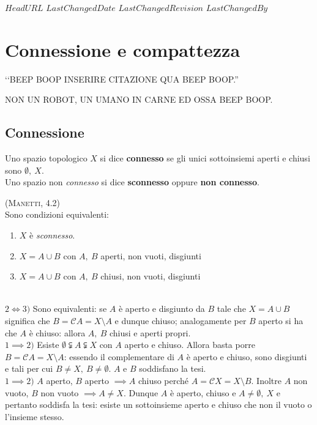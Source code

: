 \svnidlong
{$HeadURL$}
{$LastChangedDate$}
{$LastChangedRevision$}
{$LastChangedBy$}

\chapter{Connessione e compattezza}

\begin{introduction}
‘‘BEEP BOOP INSERIRE CITAZIONE QUA BEEP BOOP.''
\begin{flushright}
	\textsc{NON UN ROBOT,} UN UMANO IN CARNE ED OSSA BEEP BOOP.
\end{flushright}
\end{introduction}

\section{Connessione}
\begin{define}
Uno spazio topologico $X$ si dice \textbf{connesso} se gli unici sottoinsiemi aperti e chiusi sono $\emptyset,\ X$.\\
Uno spazio non \textit{connesso} si dice \textbf{sconnesso} oppure \textbf{non connesso}.
\end{define}
\begin{lemming}\label{sconnesso}\textsc{(Manetti, 4.2)}\\
	Sono condizioni equivalenti:
	\begin{enumerate}
		\item $X$ è \textit{sconnesso}.
		\item $X=A\cup B$ con $A,\ B$ aperti, non vuoti, disgiunti
		\item $X=A\cup B$ con $A,\ B$ chiusi, non vuoti, disgiunti
	\end{enumerate}
\end{lemming}
\begin{demonstration}~{}\\
$2\iff3)$ Sono equivalenti: se $A$ è aperto e disgiunto da $B$ tale che $X=A\cup B$ significa che $B=\mathcal{C}A=X\setminus A$ e dunque chiuso; analogamente per $B$ aperto si ha che $A$ è chiuso: allora $A,\ B$ chiusi e aperti propri.\\
$1\implies2)$ Esiste $\emptyset\subsetneqq A \subsetneqq X$ con $A$ aperto e chiuso. Allora basta porre $B=\mathcal{C}A=X\setminus A$: essendo il complementare di $A$ è aperto e chiuso, sono disgiunti e tali per cui $B\neq X,\ B\neq \emptyset$. $A$ e $B$ soddisfano la tesi.\\
$1\implies2)$ $A$ aperto, $B$ aperto $\implies A$ chiuso perché $A=\mathcal{C}X=X\setminus B$. Inoltre $A$ non vuoto, $B$ non vuoto $\implies A\neq X$. Dunque $A$ è aperto, chiuso e $A\neq \emptyset,\ X$ e pertanto soddisfa la tesi: esiste un sottoinsieme aperto e chiuso che non il vuoto o l'insieme stesso.
\end{demonstration}
